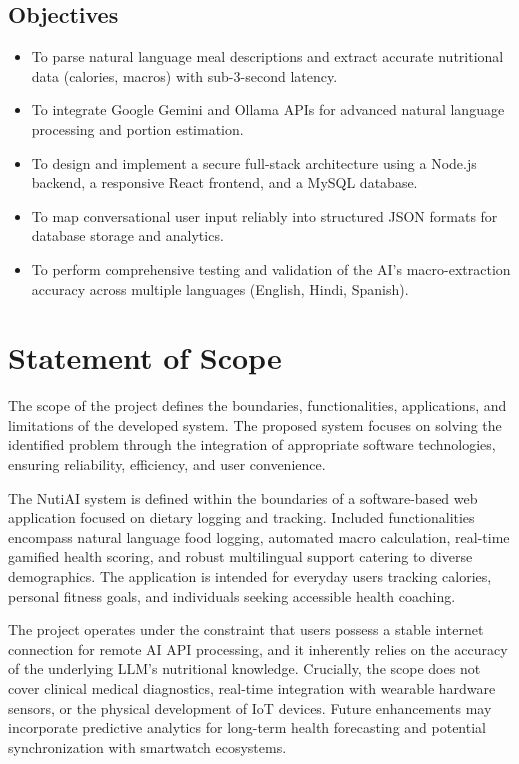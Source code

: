 \documentclass[12pt,a4paper]{report}
\begin{document}
\subsection{Objectives}
\begin{itemize}[leftmargin=*]
    \item To parse natural language meal descriptions and extract accurate nutritional data (calories, macros) with sub-3-second latency.
    \item To integrate Google Gemini and Ollama APIs for advanced natural language processing and portion estimation.
    \item To design and implement a secure full-stack architecture using a Node.js backend, a responsive React frontend, and a MySQL database.
    \item To map conversational user input reliably into structured JSON formats for database storage and analytics.
    \item To perform comprehensive testing and validation of the AI's macro-extraction accuracy across multiple languages (English, Hindi, Spanish).
\end{itemize}

\section{Statement of Scope}
The scope of the project defines the boundaries, functionalities, applications, and limitations of the developed system. The proposed system focuses on solving the identified problem through the integration of appropriate software technologies, ensuring reliability, efficiency, and user convenience.

The NutiAI system is defined within the boundaries of a software-based web application focused on dietary logging and tracking. Included functionalities encompass natural language food logging, automated macro calculation, real-time gamified health scoring, and robust multilingual support catering to diverse demographics. The application is intended for everyday users tracking calories, personal fitness goals, and individuals seeking accessible health coaching. 

The project operates under the constraint that users possess a stable internet connection for remote AI API processing, and it inherently relies on the accuracy of the underlying LLM's nutritional knowledge. Crucially, the scope does not cover clinical medical diagnostics, real-time integration with wearable hardware sensors, or the physical development of IoT devices. Future enhancements may incorporate predictive analytics for long-term health forecasting and potential synchronization with smartwatch ecosystems.
\end{document}
